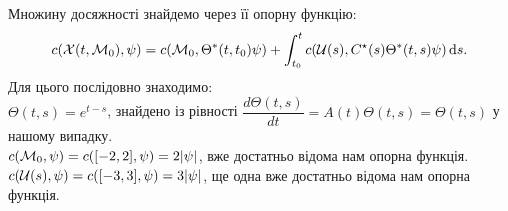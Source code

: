\begin{solution}
    Множину досяжності знайдемо через її опорну функцію: 
    \[ c(\mathcal{X}(t, \mathcal{M}_0), \psi) = c(\mathcal{M}_0, \Theta^*(t, t_0) \psi) + \int_{t_0}^t c(\mathcal{U}(s), C^\star(s) \Theta^*(t, s)\psi) \mathop{}\!\mathrm{d} s. \]
    Для цього послідовно знаходимо: \\
    
    $\Theta(t, s) = e^{t-s}$, знайдено із рівності $\dfrac{d\Theta(t,s)}{dt} = A(t)\Theta(t,s) = \Theta(t,s)$ у нашому випадку. \\
    
    $c(\mathcal{M}_0, \psi) = c([-2, 2], \psi) = 2 |\psi|$, вже достатньо відома нам опорна функція. \\
    
    $c(\mathcal{U}(s), \psi) = c([-3, 3], \psi) = 3 |\psi|$, ще одна вже достатньо відома нам опорна функція. \\
    
    

\end{solution}
